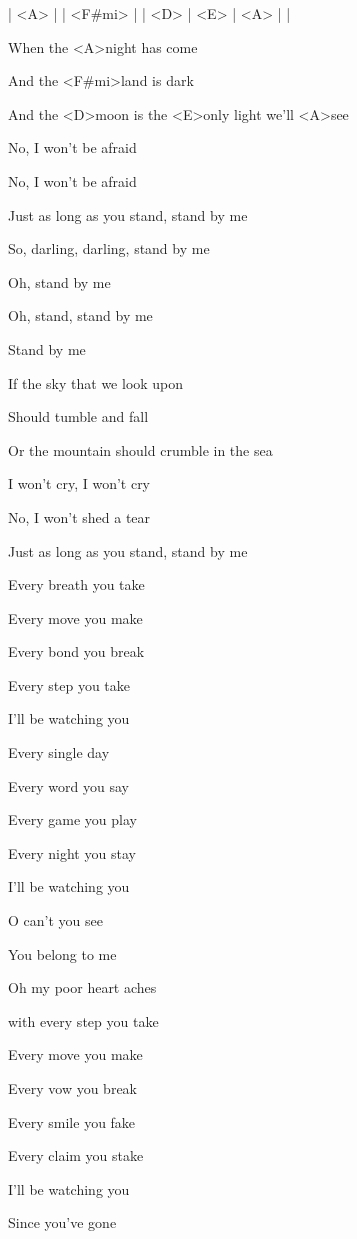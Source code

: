 

\ifdefined\TPBAND
 | <A> | | <F#mi> | | <D> | <E> | <A> | |
\fi

\zs
When the <A>night has come

And the <F#mi>land is dark

And the <D>moon is the <E>only light we'll <A>see

No, I won't be afraid

No, I won't be afraid

Just as long as you stand, stand by me
\ks

\zr
So, darling, darling, stand by me

Oh, stand by me

Oh, stand, stand by me

Stand by me
\kr

\zs
If the sky that we look upon

Should tumble and fall

Or the mountain should crumble in the sea

I won't cry, I won't cry

No, I won't shed a tear

Just as long as you stand, stand by me
\ks

\zs
Every breath you take

Every move you make

Every bond you break

Every step you take

I'll be watching you
\ks

\zs
Every single day

Every word you say

Every game you play

Every night you stay

I'll be watching you
\ks

\zr
O can't you see

You belong to me

Oh my poor heart aches 

with every step you take
\kr

\zs
Every move you make

Every vow you break

Every smile you fake

Every claim you stake

I'll be watching you
\ks

\zs
Since you've gone 

